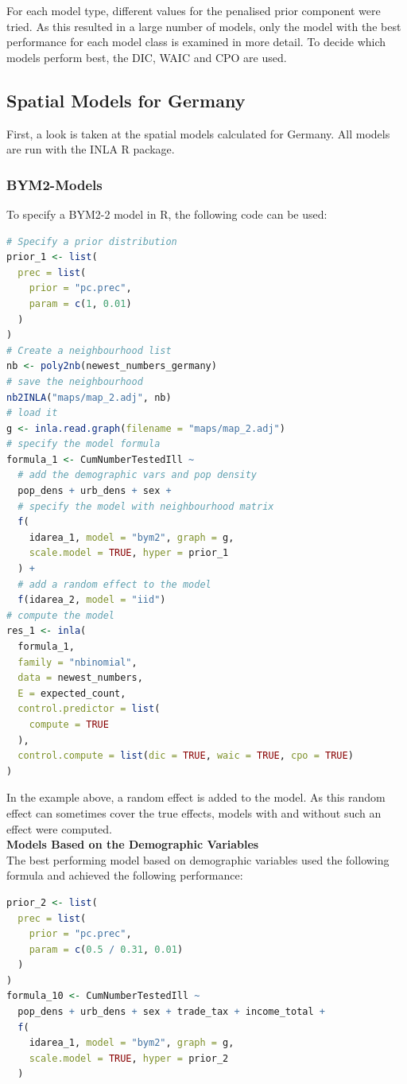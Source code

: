 For each model type, different values for the penalised prior component were tried. As this resulted in a large number of models, only the model with the best performance for each model class is examined in more detail. To decide which models perform best, the DIC, WAIC and CPO are used.
\subsection{Spatial Models for Germany}
First, a look is taken at the spatial models calculated for Germany. All models are run with the INLA \cite{rinla} R package.
\subsubsection{BYM2-Models}
To specify a BYM2-2 model in R, the following code can be used:
\begin{lstlisting}[language=R]
# Specify a prior distribution
prior_1 <- list(
  prec = list(
    prior = "pc.prec",
    param = c(1, 0.01)
  )
)
# Create a neighbourhood list
nb <- poly2nb(newest_numbers_germany)
# save the neighbourhood
nb2INLA("maps/map_2.adj", nb)
# load it
g <- inla.read.graph(filename = "maps/map_2.adj")
# specify the model formula
formula_1 <- CumNumberTestedIll ~
  # add the demographic vars and pop density
  pop_dens + urb_dens + sex + 
  # specify the model with neighbourhood matrix
  f(
    idarea_1, model = "bym2", graph = g,
    scale.model = TRUE, hyper = prior_1
  ) +
  # add a random effect to the model
  f(idarea_2, model = "iid")
# compute the model
res_1 <- inla(
  formula_1,
  family = "nbinomial",
  data = newest_numbers,
  E = expected_count,
  control.predictor = list(
    compute = TRUE
  ),
  control.compute = list(dic = TRUE, waic = TRUE, cpo = TRUE)
)
\end{lstlisting}
In the example above, a random effect is added to the model. As this random effect can sometimes cover the true effects, models with and without such an effect were computed. \\
\textbf{Models Based on the Demographic Variables} \\
The best performing model based on demographic variables used the following formula and achieved the following performance:
\begin{lstlisting}[language=R]
prior_2 <- list(
  prec = list(
    prior = "pc.prec",
    param = c(0.5 / 0.31, 0.01)
  )
)
formula_10 <- CumNumberTestedIll ~
  pop_dens + urb_dens + sex + trade_tax + income_total +
  f(
    idarea_1, model = "bym2", graph = g,
    scale.model = TRUE, hyper = prior_2
  )
\end{lstlisting}
